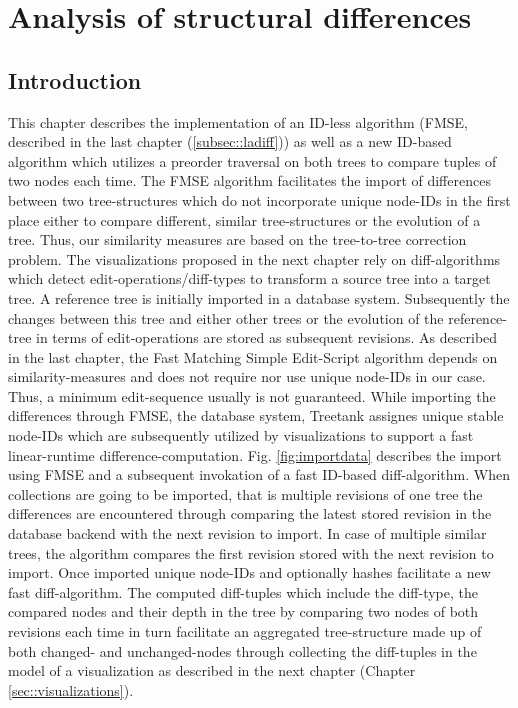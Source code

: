 \section{Analysis of structural differences}\label{sec::differences}
\subsection{Introduction}
This chapter describes the implementation of an ID-less algorithm (FMSE, described in the last chapter (\ref{subsec::ladiff})) as well as a new ID-based algorithm which utilizes a preorder traversal on both trees to compare tuples of two nodes each time. The FMSE algorithm facilitates the import of differences between two tree-structures which do not incorporate unique node-IDs in the first place either to compare different, similar tree-structures or the evolution of a tree. Thus, our similarity measures are based on the tree-to-tree correction problem. The visualizations proposed in the next chapter rely on diff-algorithms which detect edit-operations/diff-types to transform a source tree into a target tree. A reference tree is initially imported in a database system. Subsequently the changes between this tree and either other trees or the evolution of the reference-tree in terms of edit-operations are stored as subsequent revisions. As described in the last chapter, the Fast Matching Simple Edit-Script algorithm depends on similarity-measures and does not require nor use unique node-IDs in our case. Thus, a minimum edit-sequence usually is not guaranteed. While importing the differences through FMSE, the database system, Treetank assignes unique stable node-IDs which are subsequently utilized by visualizations to support a fast linear-runtime difference-computation. Fig. \ref{fig:importdata} describes the import using FMSE and a subsequent invokation of a fast ID-based diff-algorithm. When collections are going to be imported, that is multiple revisions of one tree the differences are encountered through comparing the latest stored revision in the database backend with the next revision to import. In case of multiple similar trees, the algorithm compares the first revision stored with the next revision to import. Once imported unique node-IDs and optionally hashes facilitate a new fast diff-algorithm. The computed diff-tuples which include the diff-type, the compared nodes and their depth in the tree by comparing two nodes of both revisions each time in turn facilitate an aggregated tree-structure made up of both changed- and unchanged-nodes through collecting the diff-tuples in the model of a visualization as described in the next chapter (Chapter \ref{sec::visualizations}). 

